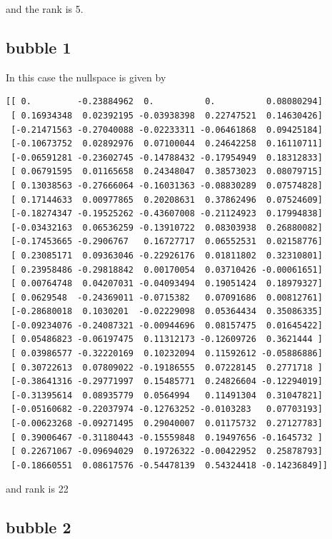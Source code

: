 and the rank is 5.

\subsection*{bubble 1}

In this case the nullspace is given by
\begin{tiny}
\begin{verbatim}
[[ 0.         -0.23884962  0.          0.          0.08080294]
 [ 0.16934348  0.02392195 -0.03938398  0.22747521  0.14630426]
 [-0.21471563 -0.27040088 -0.02233311 -0.06461868  0.09425184]
 [-0.10673752  0.02892976  0.07100044  0.24642258  0.16110711]
 [-0.06591281 -0.23602745 -0.14788432 -0.17954949  0.18312833]
 [ 0.06791595  0.01165658  0.24348047  0.38573023  0.08079715]
 [ 0.13038563 -0.27666064 -0.16031363 -0.08830289  0.07574828]
 [ 0.17144633  0.00977865  0.20208631  0.37862496  0.07524609]
 [-0.18274347 -0.19525262 -0.43607008 -0.21124923  0.17994838]
 [-0.03432163  0.06536259 -0.13910722  0.08303938  0.26880082]
 [-0.17453665 -0.2906767   0.16727717  0.06552531  0.02158776]
 [ 0.23085171  0.09363046 -0.22926176  0.01811802  0.32310801]
 [ 0.23958486 -0.29818842  0.00170054  0.03710426 -0.00061651]
 [ 0.00764748  0.04207031 -0.04093494  0.19051424  0.18979327]
 [ 0.0629548  -0.24369011 -0.0715382   0.07091686  0.00812761]
 [-0.28680018  0.1030201  -0.02229098  0.05364434  0.35086335]
 [-0.09234076 -0.24087321 -0.00944696  0.08157475  0.01645422]
 [ 0.05486823 -0.06197475  0.11312173 -0.12609726  0.3621444 ]
 [ 0.03986577 -0.32220169  0.10232094  0.11592612 -0.05886886]
 [ 0.30722613  0.07809022 -0.19186555  0.07228145  0.2771718 ]
 [-0.38641316 -0.29771997  0.15485771  0.24826604 -0.12294019]
 [-0.31395614  0.08935779  0.0564994   0.11491304  0.31047821]
 [-0.05160682 -0.22037974 -0.12763252 -0.0103283   0.07703193]
 [-0.00623268 -0.09271495  0.29040007  0.01175732  0.27127783]
 [ 0.39006467 -0.31180443 -0.15559848  0.19497656 -0.1645732 ]
 [ 0.22671067 -0.09694029  0.19726322 -0.00422952  0.25878793]
 [-0.18660551  0.08617576 -0.54478139  0.54324418 -0.14236849]]
\end{verbatim}
\end{tiny}

and rank is 22

\subsection*{bubble 2}

